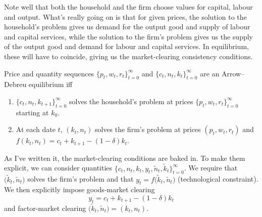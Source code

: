 \documentclass[11pt,letterpaper,reqno,oneside]{article}
\begin{document}
Note well that both the household and the firm choose values for capital, labour and output. What's really going on is that for given prices, the solution to the household's problem gives us demand for the output good and supply of labour and capital services, while the solution to the firm's problem gives us the supply of the output good and demand for labour and capital services. In equilibrium, these will have to coincide, giving us the market-clearing consistency conditions.

\begin{definition}
	Price and quantity sequences $\{ p_t, w_t, r_t \}_{t=0}^\infty$ and $\{ c_t, n_t, k_t \}_{t=0}^\infty$ are an Arrow--Debreu equilibrium iff
	\begin{enumerate}

		\item $\{ c_t, n_t, k_{t+1} \}_{t=0}^\infty$ solves the household's problem at prices $\{ p_t, w_t, r_t \}_{t=0}^\infty$ starting at $k_0$.

		\item At each date $t$, $(k_t,n_t)$ solves the firm's problem at prices $(p_t, w_t, r_t )$ and $f(k_t,n_t) = c_t + k_{t+1} - (1-\delta) k_t$.

	\end{enumerate}
\end{definition}

As I've written it, the market-clearing conditions are baked in. To make them explicit, we can consider quantities $\bigl\{ c_t, n_t, k_t, y_t, \widetilde{n}_t, \widetilde{k}_t \bigr\}_{t=0}^\infty$. We require that $\bigl(\widetilde{k}_t,\widetilde{n}_t\bigr)$ solves the firm's problem and that $y_t = f \bigl( \widetilde{k}_t, \widetilde{n}_t \bigr)$ (technological constraint). We then explicitly impose goods-market clearing
%
\begin{equation*}
	y_t = c_t + k_{t+1} - (1-\delta)k_t
\end{equation*}
%
and factor-market clearing $\bigl( \widetilde{k}_t, \widetilde{n}_t \bigr) = (k_t,n_t)$.
\end{document}
